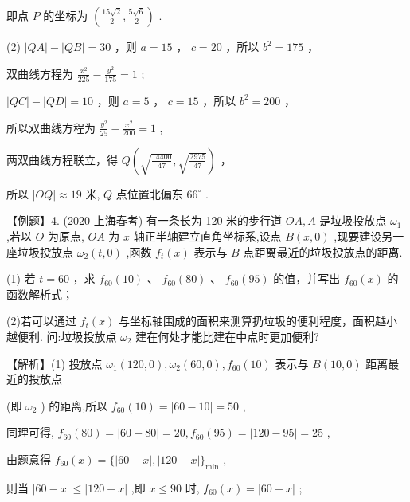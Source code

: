 \documentclass[10pt]{article}
\newcommand*\circled[1]{\tikz[baseline=(char.base)]{\node[shape=circle,draw,inner sep=1.5pt] (char) {\small #1};}}
\begin{document}
即点 \(P\) 的坐标为 \(\left( {\frac{{15}\sqrt{2}}{2},\frac{5\sqrt{6}}{2}}\right)\) .

(2) \circled{1}  \(\left| {QA}\right|  - \left| {QB}\right|  = {30}\) ，则 \(a = {15}\) ， \(c = {20}\) ，所以 \({b}^{2} = {175}\) ，

双曲线方程为 \(\frac{{x}^{2}}{225} - \frac{{y}^{2}}{175} = 1\) ;

 \circled{2}  \(\left| {QC}\right|  - \left| {QD}\right|  = {10}\) ，则 \(a = 5\) ， \(c = {15}\) ，所以 \({b}^{2} = {200}\) ，

所以双曲线方程为 \(\frac{{y}^{2}}{25} - \frac{{x}^{2}}{200} = 1\) ,

两双曲线方程联立，得 \(Q\left( {\sqrt{\frac{14400}{47}},\sqrt{\frac{2975}{47}}}\right)\) ，

所以 \(\left| {OQ}\right|  \approx  {19}\) 米, \(Q\) 点位置北偏东 \({66}^{ \circ  }\) .

【例题】4. (2020 上海春考) 有一条长为 120 米的步行道 \({OA},A\) 是垃圾投放点 \({\omega }_{1}\) ,若以 \(O\) 为原点, \({OA}\) 为 \(x\) 轴正半轴建立直角坐标系,设点 \(B\left( {x,0}\right)\) ,现要建设另一座垃圾投放点 \({\omega }_{2}\left( {t,0}\right)\) ,函数 \({f}_{t}\left( x\right)\) 表示与 \(B\) 点距离最近的垃圾投放点的距离.

(1) 若 \(t = {60}\) ，求 \({f}_{60}\left( {10}\right)\) 、 \({f}_{60}\left( {80}\right)\) 、 \({f}_{60}\left( {95}\right)\) 的值，并写出 \({f}_{60}\left( x\right)\) 的函数解析式；

(2)若可以通过 \({f}_{t}\left( x\right)\) 与坐标轴围成的面积来测算扔垃圾的便利程度，面积越小越便利. 问:垃圾投放点 \({\omega }_{2}\) 建在何处才能比建在中点时更加便利?

【解析】(1) 投放点 \({\omega }_{1}\left( {{120},0}\right) ,{\omega }_{2}\left( {{60},0}\right) ,{f}_{60}\left( {10}\right)\) 表示与 \(B\left( {{10},0}\right)\) 距离最近的投放点

(即 \({\omega }_{2}\) ) 的距离,所以 \({f}_{60}\left( {10}\right)  = \left| {{60} - {10}}\right|  = {50}\) ,

同理可得, \({f}_{60}\left( {80}\right)  = \left| {{60} - {80}}\right|  = {20},{f}_{60}\left( {95}\right)  = \left| {{120} - {95}}\right|  = {25}\) ,

由题意得 \({f}_{60}\left( x\right)  = \{ \left| {{60} - x}\right| ,\left| {{120} - x}\right| {\} }_{\min }\) ,

则当 \(\left| {{60} - x}\right|  \leq  \left| {{120} - x}\right|\) ,即 \(x \leq  {90}\) 时, \({f}_{60}\left( x\right)  = \left| {{60} - x}\right|\) ;
\end{document}
